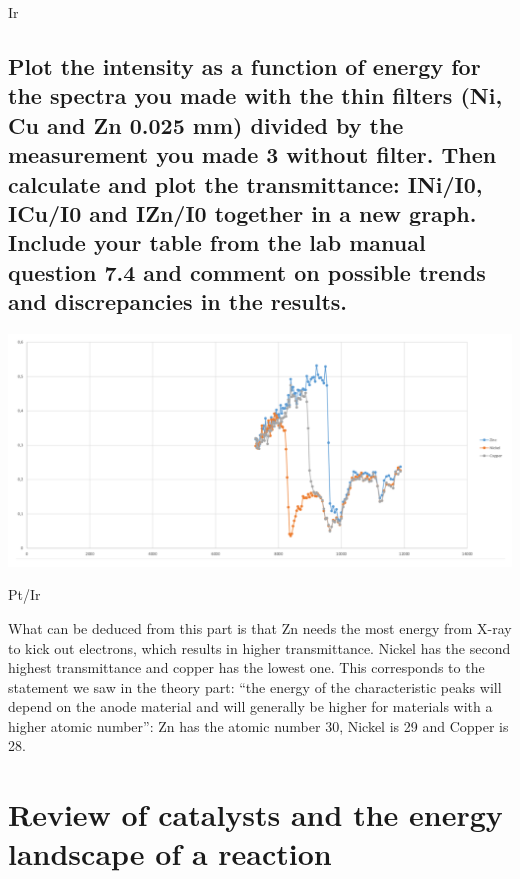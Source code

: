 Ir\documentclass{article}
\begin{document}
\subsection{Plot the intensity as a function of energy for the spectra you made with the
thin filters (Ni, Cu and Zn 0.025 mm) divided by the measurement you made
3
without filter. Then calculate and plot the transmittance: INi/I0, ICu/I0 and
IZn/I0 together in a new graph. Include your table from the lab manual
question 7.4 and comment on possible trends and discrepancies in the
results.}
\begin{center}
\includegraphics[width=\textwidth,height=\textheight,keepaspectratio]{pictures/3c.png}
\caption{Pt/Ir}
\end{center}
What can be deduced from this part is that Zn needs the most energy from X-ray to kick out electrons, which results in higher transmittance. Nickel has the second highest transmittance and copper has the lowest one. This corresponds to the statement we saw in the theory part: “the energy of the characteristic peaks will depend on the anode material and will generally be higher for materials with a higher atomic number”: Zn has the atomic number 30, Nickel is 29 and Copper is 28.

\section{Review of catalysts and the energy landscape of a reaction}
\end{document}
